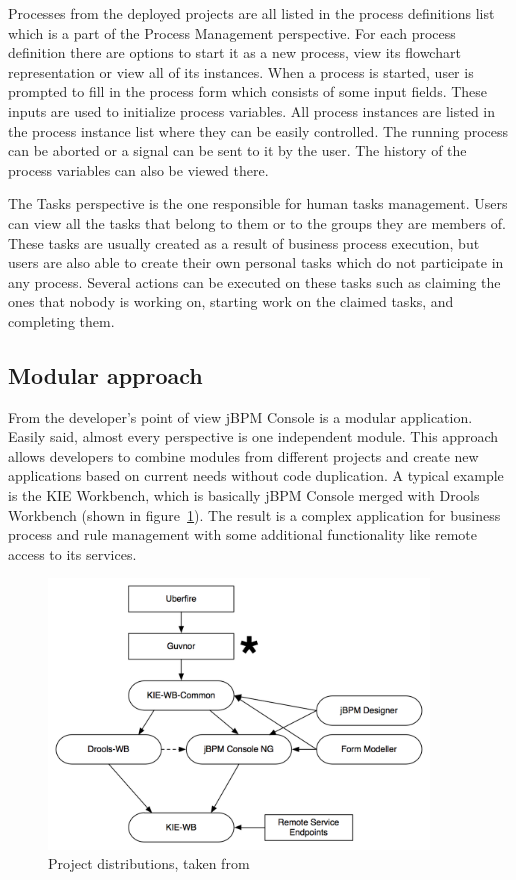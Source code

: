 \documentclass[12pt,oneside,final]{fithesis2}
\begin{document}
Processes from the deployed projects are all listed in the process definitions list which is a part of the Process Management perspective.
For each process definition there are options to start it as a new process, view its flowchart representation or view all of its instances.
When a process is started, user is prompted to fill in the process form which consists of some input fields.
These inputs are used to initialize process variables.
All process instances are listed in the process instance list where they can be easily controlled.
The running process can be aborted or a signal can be sent to it by the user.
The history of the process variables can also be viewed there.

The Tasks perspective is the one responsible for human tasks management.
Users can view all the tasks that belong to them or to the groups they are members of.
These tasks are usually created as a result of business process execution, but users are also able to create their own personal tasks which do not participate in any process.
Several actions can be executed on these tasks such as claiming the ones that nobody is working on, starting work on the claimed tasks, and completing them.

\subsection{Modular approach}

From the developer's point of view jBPM Console is a modular application.
Easily said, almost every perspective is one independent module.
This approach allows developers to combine modules from different projects and create new applications based on current needs without code duplication.
A typical example is the KIE Workbench, which is basically jBPM Console merged with Drools Workbench (shown in figure~\ref{fig:project-structure}).
The result is a complex application for business process and rule management with some additional functionality like remote access to its services.

\begin{figure}[ht!]
\centering
\includegraphics[width=0.9\textwidth]{images/project-structure.png}
\caption{Project distributions, taken from \cite{salaboy13}}
\label{fig:project-structure}
\end{figure}
\end{document}
